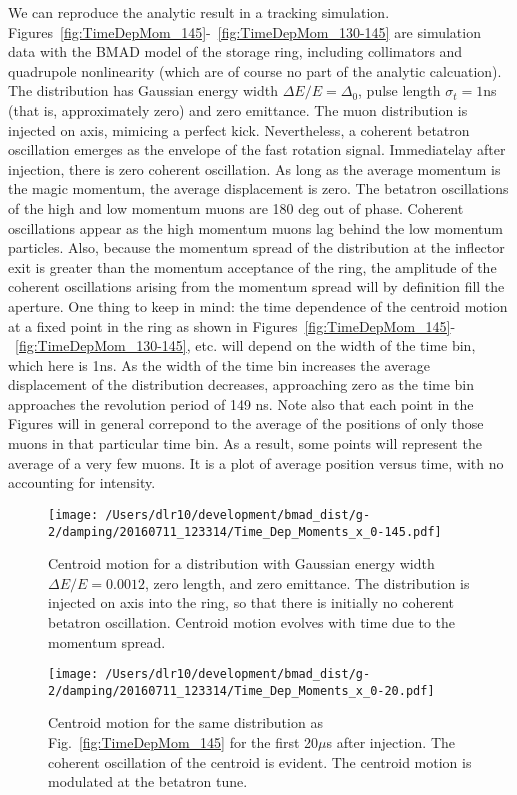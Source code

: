 \documentclass[10pt]{report}
\begin{document}
We can reproduce the analytic result in a tracking simulation. Figures~\ref{fig:TimeDepMom_145}-~\ref{fig:TimeDepMom_130-145} are simulation data
with the BMAD model of the storage ring, including collimators and quadrupole nonlinearity (which are of course no part of the analytic calcuation). 
The distribution 
has Gaussian energy width $\Delta E/E=\Delta_0$, pulse length
$\sigma_t=1$ns (that is, approximately zero) and zero emittance. The muon distribution is injected on axis, mimicing a perfect kick. Nevertheless, 
a coherent betatron oscillation emerges as the envelope of the fast rotation signal. Immediatelay after injection, there is zero coherent oscillation.
As long as the average momentum is the magic momentum, the average displacement is zero. The betatron oscillations of the high and low momentum muons
are 180 deg out of phase. Coherent oscillations appear as the high momentum muons lag behind the low momentum particles. Also, because
the momentum spread of the distribution at the inflector exit is greater than the momentum acceptance of the ring, the amplitude of the coherent oscillations
arising from the momentum spread will by definition fill the aperture. One thing to keep in mind: the time dependence of the centroid motion at a fixed point
in the ring as shown in Figures~\ref{fig:TimeDepMom_145}-~\ref{fig:TimeDepMom_130-145}, etc. will depend on the width of the time bin, which here is 1ns. 
As the width of the time bin increases the average displacement of the distribution decreases, approaching zero as the time bin approaches the revolution period of 
149 ns. Note also that each point in the Figures will in general correpond to the average of the positions of only those muons
in that particular time bin. As a result, some points will represent the average of a very few muons. It
is a plot of average position versus time, with no accounting for intensity.
%
\begin{figure}[htbp] %
\begin{minipage}[t]{0.48\textwidth}
   \centering
   \texttt{[image: /Users/dlr10/development/bmad\_dist/g-2/damping/20160711\_123314/Time\_Dep\_Moments\_x\_0-145.pdf]} 
   \caption{Centroid motion for a distribution with Gaussian energy width $\Delta E/E=0.0012$, zero length, and zero emittance. The distribution
is injected on axis into the ring, so that there is initially no coherent betatron oscillation. Centroid motion evolves
with time due to the momentum spread.\label{fig:TimeDepMom_145}}
 \end{minipage}
\hfill
\begin{minipage}[t]{0.48\textwidth}
\centering
   \texttt{[image: /Users/dlr10/development/bmad\_dist/g-2/damping/20160711\_123314/Time\_Dep\_Moments\_x\_0-20.pdf]} 
\caption{Centroid motion for the same distribution as Fig.~\ref{fig:TimeDepMom_145} for the first 20$\mu$s after injection. The coherent oscillation of the centroid
is evident. The centroid motion is modulated at the betatron tune.
\label{fig:TimeDepMom_0-20}}
\end{minipage}
\end{figure}
\end{document}
